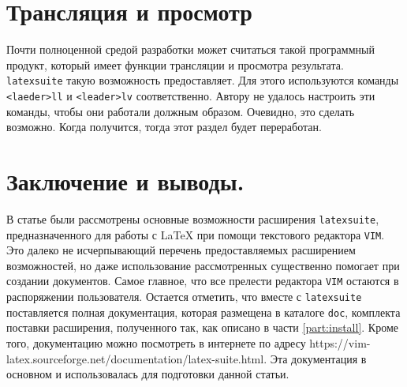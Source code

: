 \documentclass[a4paper]{article}
\begin{document}
\part{Трансляция и просмотр}
Почти полноценной средой разработки может считаться такой программный продукт, который
имеет функции трансляции и просмотра результата. \texttt{latexsuite} такую возможность
предоставляет. Для этого используются команды \texttt{<laeder>ll} и \texttt{<leader>lv}
соответственно. Автору не удалось настроить эти команды, чтобы они работали должным образом. 
Очевидно, это сделать возможно. Когда получится, тогда этот раздел будет переработан.
\part{Заключение и выводы.}
В статье были рассмотрены основные возможности расширения \texttt{latexsuite}, 
предназначенного для работы с \LaTeX{} при помощи текстового редактора \texttt{VIM}.
Это далеко не исчерпывающий перечень предоставляемых расширением возможностей, но даже 
использование рассмотренных существенно помогает при создании документов. Самое главное, 
что все прелести редактора \texttt{VIM} остаются в распоряжении пользователя. 
Остается отметить, что вместе с \texttt{latexsuite} поставляется полная документация,
которая размещена в каталоге \texttt{doc}, комплекта поставки расширения, полученного
так, как описано в части \ref{part:install}. Кроме того, документацию можно посмотреть 
в интернете по адресу https://vim-latex.sourceforge.net/documentation/latex-suite.html.
Эта документация в основном и использовалась для подготовки данной статьи. 
\end{document}
